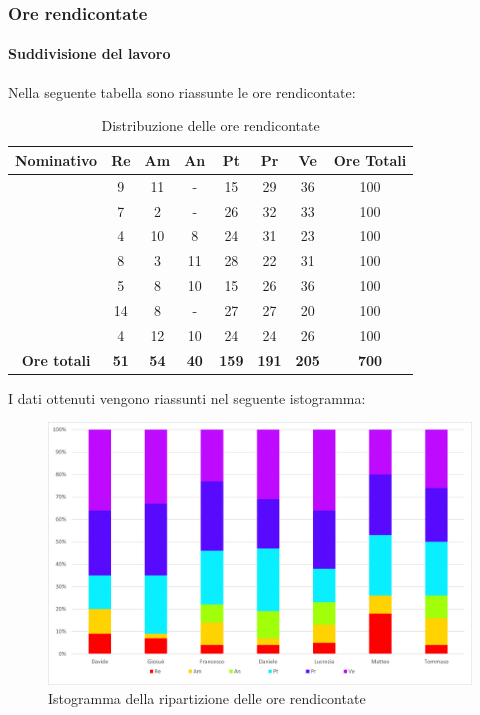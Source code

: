 \subsubsection{Ore rendicontate}
\paragraph{Suddivisione del lavoro}
Nella seguente tabella sono riassunte le ore rendicontate:
\begin{table}[H]
		\begin{center}
			\setlength{\aboverulesep}{0pt}
			\setlength{\belowrulesep}{0pt}
			\setlength{\extrarowheight}{.75ex}
			\begin{tabular}{ c c c c c c c c }
				\rowcolor{AzzurroGruppo!30} 
				\textbf{Nominativo} & \textbf{Re} & \textbf{Am} & \textbf{An} & \textbf{Pt} & \textbf{Pr} & \textbf{Ve} & \textbf{Ore Totali}  \\
				\toprule
				\Davide    & 9  & 11 & -  & 15  & 29 & 36 & 100 \\
				\Giosue    & 7  & 2 & -  & 26 & 32 & 33  & 100 \\
				\Francesco & 4  & 10 & 8  & 24 & 31 & 23  & 100\\
				\Daniele   & 8  & 3 & 11 & 28 & 22 & 31  & 100\\
				\Lucrezia  & 5  & 8 & 10 & 15  & 26 & 36 & 100\\
				\Matteo    & 14 & 8 & -  & 27 & 27 & 20  & 100\\
				\Tommaso   & 4  & 12 & 10 & 24  & 24 & 26  & 100\\
				 \textbf{Ore totali} & \textbf{51} & \textbf{54} & \textbf{40} & \textbf{159} & \textbf{191} & \textbf{205} & \textbf{700} \\
				\bottomrule
			\end{tabular}
			\caption{Distribuzione delle ore rendicontate}
		\end{center}
	\end{table}
	I dati ottenuti vengono riassunti nel seguente istogramma:
\begin{figure}[H]
    \centering
    \includegraphics[scale = 0.5]{components/img/Totale-rendicontate-isto.png}
    \caption{ Istogramma della ripartizione delle ore rendicontate}
    \label{fig:Istogramma ripartizione ore totali rendicontate}
\end{figure}
